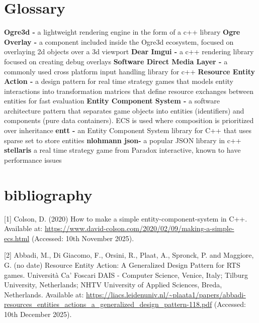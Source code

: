 \documentclass[]{final_report}
\begin{document}
\chapter{Glossary}
\textbf{Ogre3d - }a lightweight rendering engine in the form of a c++ library \newline
\textbf{Ogre Overlay -} a component included inside the Ogre3d ecosystem, focused on overlaying 2d objects over a 3d viewport \newline
\textbf{Dear Imgui - }a c++ rendering library focused on creating debug overlays \newline
\textbf{Software Direct Media Layer -} a commonly used cross platform input handling library for c++ \newline
\textbf{Resource Entity Action - }a design pattern for real time strategy games that 
models entity interactions into transformation matrices that define resource exchanges between entities for fast evaluation \newline
\textbf{Entity Component System - }a software architecture pattern that separates
game objects into entities (identifiers) and components (pure data containers).
ECS is used where composition is prioritized over inheritance \newline
\textbf{entt - }an Entity Component System library for C++ that uses sparse set to
store entities \newline
\textbf{nlohmann json-} a popular JSON library in c++ \newline
\textbf{stellaris} a real time strategy game from Paradox interactive, known to have performance issues \newline


\chapter{bibliography}
[1] Colson, D. (2020) How to make a simple entity-component-system in C++. Available at: \url{https://www.david-colson.com/2020/02/09/making-a-simple-ecs.html} (Accessed: 10th November 2025). \newline

[2] Abbadi, M., Di Giacomo, F., Orsini, R., Plaat, A., Spronck, P. and Maggiore, G. (no date) Resource Entity Action: A Generalized Design Pattern for RTS games. Università Ca' Foscari DAIS - Computer Science, Venice, Italy; Tilburg University, Netherlands; NHTV University of Applied Sciences, Breda, Netherlands. Available at: \url{https://liacs.leidenuniv.nl/~plaata1/papers/abbadi-resources_entities_actions_a_generalized_design_pattern-118.pdf} (Accessed: 10th December 2025). \newline
\end{document}
